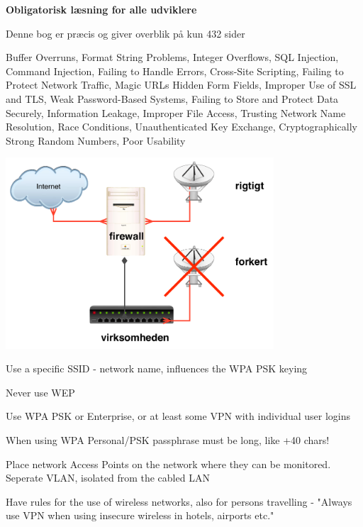 \documentclass[20pt,landscape,a4paper,footrule]{foils}
\begin{document}
\begin{list1}
\item {\bf Obligatorisk læsning for alle udviklere}
\item Denne bog er præcis og giver overblik på kun 432 sider
\item Buffer Overruns, Format String Problems, Integer Overflows, SQL Injection, Command Injection,
Failing to Handle Errors, Cross-Site Scripting, Failing to Protect Network Traffic, Magic URLs Hidden Form Fields,
Improper Use of SSL and TLS, Weak Password-Based Systems, Failing to Store and Protect Data Securely, Information
Leakage, Improper File Access, Trusting Network Name Resolution, Race Conditions, Unauthenticated Key Exchange, Cryptographically Strong Random Numbers, Poor Usability
\end{list1}







\begin{minipage}{10cm}
\includegraphics[width=10cm]{images/wlan-accesspoint-2.pdf}
\end{minipage}
\begin{minipage}{\linewidth-10cm}
\begin{list2}
\item Use a specific SSID - network name, influences the WPA PSK keying
\item Never use WEP
\item Use WPA PSK or Enterprise, or at least some VPN with individual user logins

\item When using WPA Personal/PSK passphrase must be long, like +40 chars!
\item Place network Access Points on the network where they can be monitored. Seperate VLAN, isolated from the cabled LAN
\item Have rules for the use of wireless networks, also for persons travelling - "Always use VPN when using insecure wireless in hotels, airports etc."
\end{list2}
\end{minipage}
\end{document}
